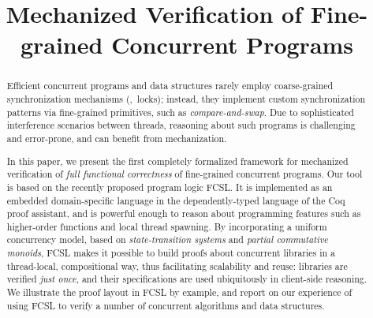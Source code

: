 \documentclass[pldi,nocopyrightspace]{sigplanconf-pldi15}
\begin{document}




\authorinfo{}



\title{
Mechanized Verification of Fine-grained Concurrent Programs 
\vspace{-65pt}
}
 


\maketitle

\begin{abstract}

  Efficient concurrent programs and data structures rarely employ
  coarse-grained synchronization mechanisms (\ie,~locks); instead,
  they implement custom synchronization patterns via fine-grained
  primitives, such as \emph{compare-and-swap}.
  Due to sophisticated interference scenarios between threads,
  reasoning about such programs is challenging and error-prone, and
  can benefit from mechanization.
  
  In this paper, we present the first completely formalized framework for
  mechanized verification of \emph{full functional correctness} of
  fine-grained concurrent programs. Our tool is based on the recently
  proposed program logic FCSL.
  It is implemented as an embedded domain-specific language in the
  dependently-typed language of the Coq proof assistant, and is
  powerful enough to reason about programming features such as
  higher-order functions and local thread spawning. By incorporating a
  uniform concurrency model, based on \emph{state-transition systems}
  and \emph{partial commutative monoids}, FCSL makes it possible to
  build proofs about concurrent libraries in a thread-local,
  compositional way, thus facilitating scalability and reuse:
  libraries are verified \emph{just once}, and their specifications
  are used ubiquitously in client-side reasoning.
  We illustrate the proof layout in FCSL by example, and report on
  our experience of using FCSL to verify a number of concurrent
  algorithms and data structures.

\end{abstract}














%
\softraggedright

\end{document}
